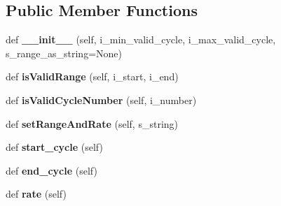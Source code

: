 \subsection*{Public Member Functions}
\begin{DoxyCompactItemize}
\item 
def {\bfseries \+\_\+\+\_\+init\+\_\+\+\_\+} (self, i\+\_\+min\+\_\+valid\+\_\+cycle, i\+\_\+max\+\_\+valid\+\_\+cycle, s\+\_\+range\+\_\+as\+\_\+string=None)\hypertarget{classnegui_1_1pgutilityclasses_1_1NbAdjustmentRangeAndRate_a6c22de41e6755accc4c9878ac714c8db}{}\label{classnegui_1_1pgutilityclasses_1_1NbAdjustmentRangeAndRate_a6c22de41e6755accc4c9878ac714c8db}

\item 
def {\bfseries is\+Valid\+Range} (self, i\+\_\+start, i\+\_\+end)\hypertarget{classnegui_1_1pgutilityclasses_1_1NbAdjustmentRangeAndRate_a99a77b4405eb93b37788cd238c9e7504}{}\label{classnegui_1_1pgutilityclasses_1_1NbAdjustmentRangeAndRate_a99a77b4405eb93b37788cd238c9e7504}

\item 
def {\bfseries is\+Valid\+Cycle\+Number} (self, i\+\_\+number)\hypertarget{classnegui_1_1pgutilityclasses_1_1NbAdjustmentRangeAndRate_ab0770eaae9e2a95554aee493d5c235a3}{}\label{classnegui_1_1pgutilityclasses_1_1NbAdjustmentRangeAndRate_ab0770eaae9e2a95554aee493d5c235a3}

\item 
def {\bfseries set\+Range\+And\+Rate} (self, s\+\_\+string)\hypertarget{classnegui_1_1pgutilityclasses_1_1NbAdjustmentRangeAndRate_a9b7441041bd80281f44e24ade3470c9f}{}\label{classnegui_1_1pgutilityclasses_1_1NbAdjustmentRangeAndRate_a9b7441041bd80281f44e24ade3470c9f}

\item 
def {\bfseries start\+\_\+cycle} (self)\hypertarget{classnegui_1_1pgutilityclasses_1_1NbAdjustmentRangeAndRate_a090215270434fee82431a0c9a59cf35a}{}\label{classnegui_1_1pgutilityclasses_1_1NbAdjustmentRangeAndRate_a090215270434fee82431a0c9a59cf35a}

\item 
def {\bfseries end\+\_\+cycle} (self)\hypertarget{classnegui_1_1pgutilityclasses_1_1NbAdjustmentRangeAndRate_a97e299bb098b2da8a022e62d6e9b1bbb}{}\label{classnegui_1_1pgutilityclasses_1_1NbAdjustmentRangeAndRate_a97e299bb098b2da8a022e62d6e9b1bbb}

\item 
def {\bfseries rate} (self)\hypertarget{classnegui_1_1pgutilityclasses_1_1NbAdjustmentRangeAndRate_aa8ee83b9c730cc0ee925a7b59ad7ac60}{}\label{classnegui_1_1pgutilityclasses_1_1NbAdjustmentRangeAndRate_aa8ee83b9c730cc0ee925a7b59ad7ac60}

\end{DoxyCompactItemize}


